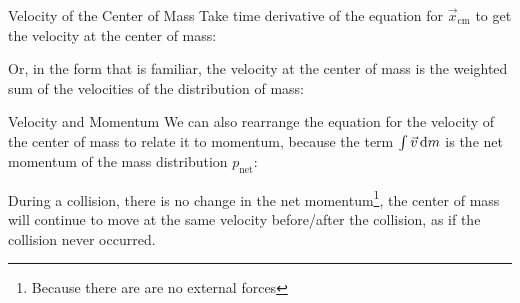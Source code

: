 \documentclass[12pt,compress,aspectratio=169]{beamer}
\begin{document}
%    

%
%
%    



\begin{frame}{Velocity of the Center of Mass}
  Take time derivative of the equation for $\vec x_\text{cm}$ to get the
  velocity at the center of mass:


  Or, in the form that is familiar, the velocity at the center of mass is the
  weighted sum of the velocities of the distribution of mass:
  
\end{frame}



\begin{frame}{Velocity and Momentum}
  We can also rearrange the equation for the velocity of the center of mass to
  relate it to momentum, because the term $\int\vec v\dl m$ is the net momentum
  of the mass distribution $p_\text{net}$:
  

  During a collision, there is no change in the net momentum\footnote{Because
  there are are no external forces}, the center of mass will continue to move
  at the same velocity before/after the collision, as if the collision never
  occurred.
\end{frame}
\end{document}
